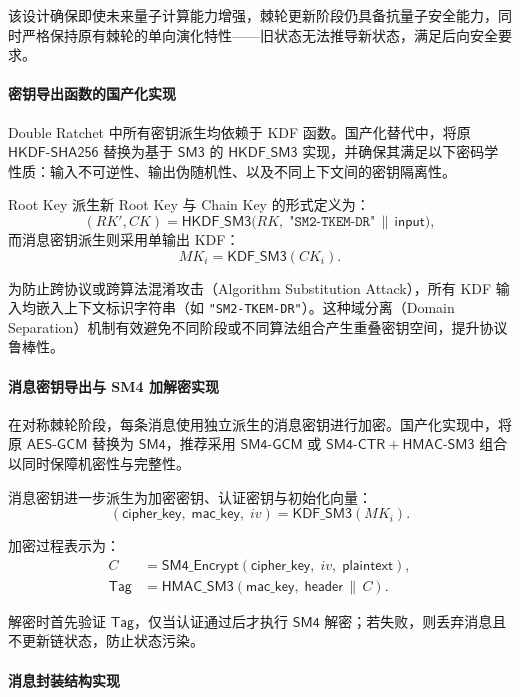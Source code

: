该设计确保即使未来量子计算能力增强，棘轮更新阶段仍具备抗量子安全能力，同时严格保持原有棘轮的单向演化特性——旧状态无法推导新状态，满足后向安全要求。

\paragraph{密钥导出函数的国产化实现}{}
\label{sec:kdf_sm3}

Double Ratchet 中所有密钥派生均依赖于 KDF 函数。国产化替代中，将原 $\mathsf{HKDF\text{-}SHA256}$ 替换为基于 $\mathsf{SM3}$ 的 $\mathsf{HKDF\_SM3}$ 实现，并确保其满足以下密码学性质：输入不可逆性、输出伪随机性、以及不同上下文间的密钥隔离性。

Root Key 派生新 Root Key 与 Chain Key 的形式定义为：
\[
(RK', CK) = \mathsf{HKDF\_SM3}\big( RK,\; \texttt{"SM2-TKEM-DR"} \,\|\, \mathsf{input} \big),
\]
而消息密钥派生则采用单输出 KDF：
\[
MK_i = \mathsf{KDF\_SM3}(CK_i).
\]

为防止跨协议或跨算法混淆攻击（Algorithm Substitution Attack），所有 KDF 输入均嵌入上下文标识字符串（如 \texttt{"SM2-TKEM-DR"}）。这种域分离（Domain Separation）机制有效避免不同阶段或不同算法组合产生重叠密钥空间，提升协议鲁棒性。

\paragraph{消息密钥导出与 SM4 加解密实现}
\label{sec:sm4_encryption}

在对称棘轮阶段，每条消息使用独立派生的消息密钥进行加密。国产化实现中，将原 $\mathsf{AES\text{-}GCM}$ 替换为 $\mathsf{SM4}$，推荐采用 $\mathsf{SM4\text{-}GCM}$ 或 $\mathsf{SM4\text{-}CTR} + \mathsf{HMAC\text{-}SM3}$ 组合以同时保障机密性与完整性。

消息密钥进一步派生为加密密钥、认证密钥与初始化向量：
\[
(\mathsf{cipher\_key},\; \mathsf{mac\_key},\; iv) = \mathsf{KDF\_SM3}(MK_i).
\]

加密过程表示为：
\begin{align}
C &= \mathsf{SM4\_Encrypt}(\mathsf{cipher\_key},\; iv,\; \mathsf{plaintext}), \\
\mathsf{Tag} &= \mathsf{HMAC\_SM3}(\mathsf{mac\_key},\; \mathsf{header} \,\|\, C).
\end{align}

解密时首先验证 $\mathsf{Tag}$，仅当认证通过后才执行 $\mathsf{SM4}$ 解密；若失败，则丢弃消息且不更新链状态，防止状态污染。

\paragraph{消息封装结构实现}
\label{sec:message_format}

